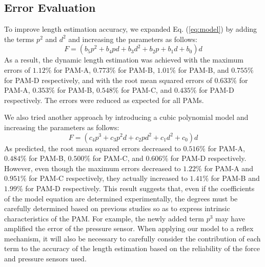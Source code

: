 \subsection{Error Evaluation}
To improve length estimation accuracy, we expanded Eq. (\ref{eq:model}) by adding the terms $p^2$ and $d^2$ and increasing the parameters as follows:
\begin{equation}
\label{eq:model_2d(1)}
F = (b_5p^2 + b_4pd + b_3d^2 + b_2p+b_1d+b_0)d
\end{equation}
As a result, the dynamic length estimation was achieved with the maximum errors of $1.12\%$ for PAM-A, $0.773\%$ for PAM-B, $1.01\%$ for PAM-B, and $0.755\%$ for PAM-D respectively, and with the root mean squared errors of $0.633\%$ for PAM-A, $0.353\%$ for PAM-B, $0.548\%$ for PAM-C, and $0.435\%$ for PAM-D respectively. The errors were reduced as expected for all PAMs. 


We also tried another approach by introducing a cubic polynomial model and increasing the parameters as follows:
\begin{equation}
    \label{eq:model_3d}
    F = (c_4p^3+c_3p^2d+c_2pd^2+c_1d^2+c_0)d
\end{equation}
As predicted, the root mean squared errors decreased to $0.516\%$ for PAM-A, $0.484\%$ for PAM-B, $0.500\%$ for PAM-C, and $0.606\%$ for PAM-D respectively. 
However, even though the maximum errors decreased to $1.22\%$ for PAM-A and $0.951\%$ for PAM-C respectively, they actually increased to $1.41\%$ for PAM-B and $1.99\%$ for PAM-D respectively. This result suggests that, even if the coefficients of the model equation are determined experimentally, the degrees must be carefully determined based on previous studies so as to express intrinsic characteristics of the PAM. For example, the newly added term $p^3$ may have amplified the error of the pressure sensor. When applying our model to a reflex mechanism, it will also be necessary to carefully consider the contribution of each term to the accuracy of the length estimation based on the reliability of the force and pressure sensors used.

